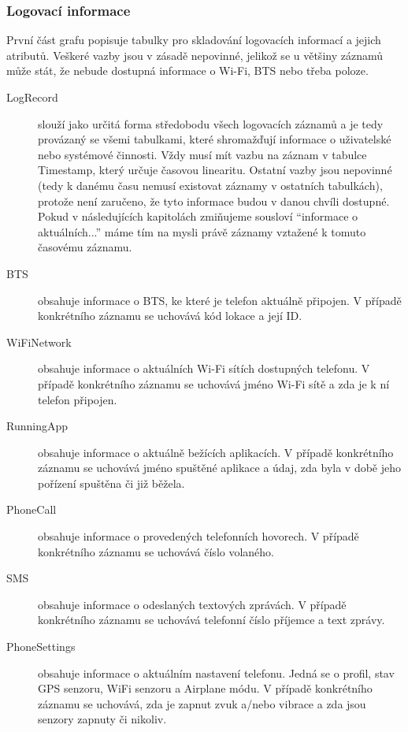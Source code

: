 \documentclass[thesis=M,czech]{FITthesis}[2012/06/26]
\begin{document}
\subsubsection*{Logovací informace}
První část grafu popisuje tabulky pro skladování logovacích informací a jejich atributů. Veškeré vazby jsou v zásadě nepovinné, jelikož se u většiny záznamů může stát, že nebude dostupná informace o Wi-Fi, BTS nebo třeba poloze.

\begin{description}
\item[LogRecord]
slouží jako určitá forma středobodu všech logovacích záznamů a je tedy provázaný se všemi tabulkami, které shromažďují informace o uživatelské nebo systémové činnosti. Vždy musí mít vazbu na záznam v tabulce Timestamp, který určuje časovou linearitu. Ostatní vazby jsou nepovinné (tedy k danému času nemusí existovat záznamy v ostatních tabulkách), protože není zaručeno, že tyto informace budou v danou chvíli dostupné. Pokud v následujících kapitolách zmiňujeme sousloví “informace o aktuálních...” máme tím na mysli právě záznamy vztažené k tomuto časovému záznamu.

\item[BTS]
obsahuje informace o BTS, ke které je telefon aktuálně připojen. V případě konkrétního záznamu se uchovává kód lokace a její ID.

\item[WiFiNetwork]
obsahuje informace o aktuálních Wi-Fi sítích dostupných telefonu. V případě konkrétního záznamu se uchovává jméno Wi-Fi sítě a zda je k ní telefon připojen.

\item[RunningApp]
obsahuje informace o aktuálně bežících aplikacích. V případě konkrétního záznamu se uchovává jméno spuštěné aplikace a údaj, zda byla v době jeho pořízení spuštěna či již běžela.

\item[PhoneCall]
obsahuje informace o provedených telefonních hovorech. V případě konkrétního záznamu se uchovává číslo volaného.

\item[SMS]
obsahuje informace o odeslaných textových zprávách. V případě konkrétního záznamu se uchovává telefonní číslo příjemce a text zprávy.

\item[PhoneSettings]
obsahuje informace o aktuálním nastavení telefonu. Jedná se o profil, stav GPS senzoru, WiFi senzoru a Airplane módu. V případě konkrétního záznamu se uchovává, zda je zapnut zvuk a/nebo vibrace a zda jsou senzory zapnuty či nikoliv.


\end{description}
\end{document}
